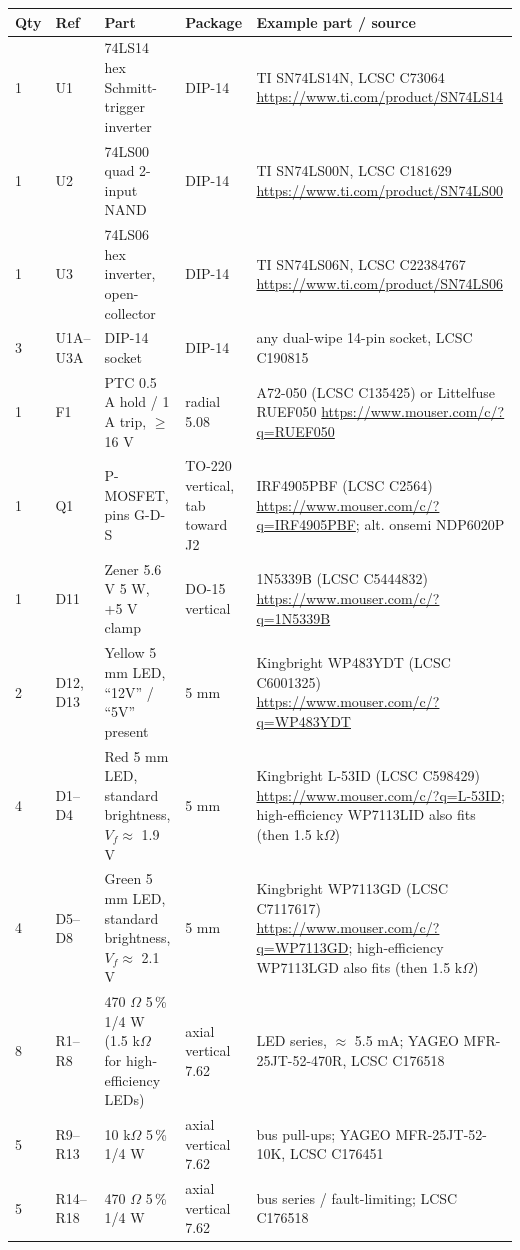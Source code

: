 \documentclass[11pt,a4paper]{article}
\begin{document}
\begin{longtable}{@{}p{8mm}p{18mm}p{52mm}p{22mm}p{62mm}@{}}
\toprule
Qty & Ref & Part & Package & Example part / source\\
\midrule
\endhead
1 & U1 & 74LS14 hex Schmitt-trigger inverter & DIP-14 & TI SN74LS14N, LCSC C73064 \url{https://www.ti.com/product/SN74LS14}\\
1 & U2 & 74LS00 quad 2-input NAND & DIP-14 & TI SN74LS00N, LCSC C181629 \url{https://www.ti.com/product/SN74LS00}\\
1 & U3 & 74LS06 hex inverter, open-collector & DIP-14 & TI SN74LS06N, LCSC C22384767 \url{https://www.ti.com/product/SN74LS06}\\
3 & U1A--U3A & DIP-14 socket & DIP-14 & any dual-wipe 14-pin socket, LCSC C190815\\
1 & F1 & PTC 0.5 A hold / 1 A trip, $\ge$ 16 V & radial 5.08 & A72-050 (LCSC C135425) or Littelfuse RUEF050 \url{https://www.mouser.com/c/?q=RUEF050}\\
1 & Q1 & P-MOSFET, pins G-D-S & TO-220 vertical, tab toward J2 & IRF4905PBF (LCSC C2564) \url{https://www.mouser.com/c/?q=IRF4905PBF}; alt. onsemi NDP6020P\\
1 & D11 & Zener 5.6 V 5 W, +5 V clamp & DO-15 vertical & 1N5339B (LCSC C5444832) \url{https://www.mouser.com/c/?q=1N5339B}\\
2 & D12, D13 & Yellow 5 mm LED, ``12V'' / ``5V'' present & 5 mm & Kingbright WP483YDT (LCSC C6001325) \url{https://www.mouser.com/c/?q=WP483YDT}\\
4 & D1--D4 & Red 5 mm LED, standard brightness, $V_f \approx$ 1.9 V & 5 mm & Kingbright L-53ID (LCSC C598429) \url{https://www.mouser.com/c/?q=L-53ID}; high-efficiency WP7113LID also fits (then 1.5 k$\Omega$)\\
4 & D5--D8 & Green 5 mm LED, standard brightness, $V_f \approx$ 2.1 V & 5 mm & Kingbright WP7113GD (LCSC C7117617) \url{https://www.mouser.com/c/?q=WP7113GD}; high-efficiency WP7113LGD also fits (then 1.5 k$\Omega$)\\
8 & R1--R8 & 470 $\Omega$ 5\,\% 1/4 W (1.5 k$\Omega$ for high-efficiency LEDs) & axial vertical 7.62 & LED series, $\approx$ 5.5 mA; YAGEO MFR-25JT-52-470R, LCSC C176518\\
5 & R9--R13 & 10 k$\Omega$ 5\,\% 1/4 W & axial vertical 7.62 & bus pull-ups; YAGEO MFR-25JT-52-10K, LCSC C176451\\
5 & R14--R18 & 470 $\Omega$ 5\,\% 1/4 W & axial vertical 7.62 & bus series / fault-limiting; LCSC C176518\\

\end{longtable}
\end{document}
